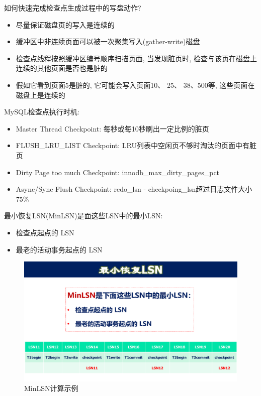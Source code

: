 如何快速完成检查点生成过程中的写盘动作?
\begin{itemize}
    \item 尽量保证磁盘页的写入是连续的
    \item 缓冲区中非连续页面可以被一次聚集写入(gather-write)磁盘
    \item 检查点线程按照缓冲区编号顺序扫描页面, 当发现脏页时, 检查与该页在磁盘上连续的其他页面是否也是脏的
    \item 假如它看到页面5是脏的, 它可能会写入页面10、 25、 38、500等, 这些页面在磁盘上是连续的
\end{itemize}

MySQL检查点执行时机:
\begin{itemize}
    \item Master Thread Checkpoint: 每秒或每10秒刷出一定比例的脏页
    \item FLUSH\_LRU\_LIST Checkpoint: LRU列表中空闲页不够时淘汰的页面中有脏页
    \item Dirty Page too much Checkpoint: innodb\_max\_dirty\_pages\_pct
    \item Async/Sync Flush Checkpoint: redo\_lsn - checkpoing\_lsn超过日志文件大小75\%
\end{itemize}

\begin{definition}[最小恢复LSN]
最小恢复LSN(MinLSN)是面这些LSN中的最小LSN:
\begin{itemize}
    \item 检查点起点的 LSN
    \item 最老的活动事务起点的 LSN
\end{itemize}
\end{definition}

\begin{figure}[H]
    \centering
    \includegraphics[width=\textwidth]{figure/MINLSN.pdf}
    \caption{MinLSN计算示例}
\end{figure}


